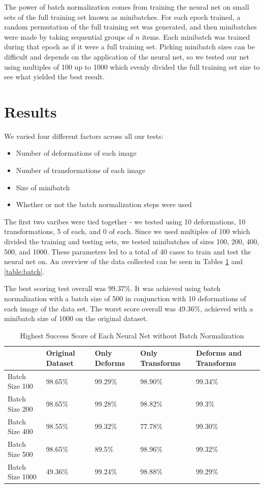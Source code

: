\documentclass{article}
\begin{document}
The power of batch normalization comes from training the neural net on small sets of the full training set known as minibatches. For each epoch trained, a random permutation of the full training set was generated, and then minibatches were made by taking sequential groups of $n$ items. Each minibatch was trained during that epoch as if it were a full training set. Picking minibatch sizes can be difficult and depends on the application of the neural net, so we tested our net using multiples of 100 up to 1000 which evenly divided the full training set size to see what yielded the best result.


\section{Results}
We varied four different factors across all our tests:
\begin{itemize}
\item Number of deformations of each image
\item Number of transformations of each image
\item Size of minibatch
\item Whether or not the batch normalization steps were used
\end{itemize}
The first two varibes were tied together - we tested using 10 deformations, 10 transformations, 5 of each, and 0 of each. Since we used multiples of 100 which divided the training and testing sets, we tested minibatches of sizes 100, 200, 400, 500, and 1000. These parameters led to a total of 40 cases to train and test the neural net on. An overview of the data collected can be seen in Tables \ref{table:nobatch} and \ref{table:batch}.

The best scoring test overall was 99.37\%. It was achieved using batch normalization with a batch size of 500 in conjunction with 10 deformations of each image of the data set. The worst score overall was 49.36\%, achieved with a minibatch size of 1000 on the original dataset.

\begin{table}[t]
  \caption{Highest Success Score of Each Neural Net without Batch Normalization}
  \centering
  \begin{tabular}{lllll}
    \toprule
    & Original Dataset & Only Deforms & Only Transforms & Deforms and Transforms \\
    \midrule
    Batch Size 100 & 98.65\% & 99.29\% & 98.90\% & 99.34\%  \\
    Batch Size 200 & 98.65\% & 99.28\% & 98.82\% &99.3\%  \\
    Batch Size 400 & 98.55\% & 99.32\% & 77.78\% & 99.30\%\\
    Batch Size 500 & 98.65\% & 89.5\% & 98.96\% & 99.32\% \\
    Batch Size 1000 & 49.36\% & 99.24\% & 98.88\% & 99.29\% \\
    \bottomrule
  \end{tabular}
  \label{table:nobatch}
\end{table}
\end{document}
